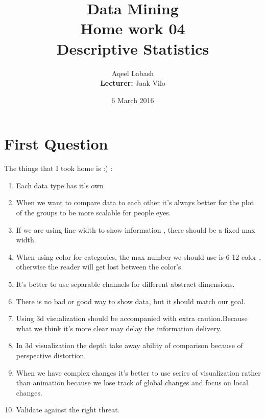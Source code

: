 \documentclass{article}
\title{Data Mining\\
		Home work 04\\Descriptive Statistics}
\author{Aqeel Labash\\ \textbf{Lecturer:} Jaak Vilo}
\date{6 March 2016}
\begin{document}
	\maketitle
	\section*{First Question}
	The things that I took home is :) :
	\begin{enumerate}
\item  Each data type has it's own
\item When we want to compare data to each other it's always better for the plot of the groups to be more scalable for people eyes.
\item If we are using line width to show information , there should be a fixed max width.
\item When using color for categories, the max number we should use is 6-12 color , otherwise the reader will get lost between the color's.
\item It's better to use separable channels for different abstract dimensions.
\item There is no bad or good way to show data, but it should match our goal.
\item Using 3d visualization should be accompanied with extra caution.Because what we think it's more clear may delay the information delivery.
\item In 3d visualization the depth take away ability of comparison because of perspective distortion.
\item When we have complex changes it's better to use series of visualization rather than animation because we lose track of global changes and focus on local changes.
\item Validate against the right threat.
	\end{enumerate}
\end{document}
